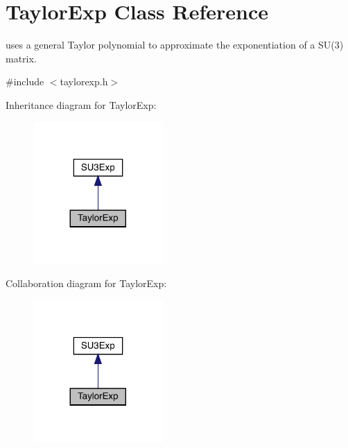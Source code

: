 \hypertarget{class_taylor_exp}{}\section{Taylor\+Exp Class Reference}
\label{class_taylor_exp}


uses a general Taylor polynomial to approximate the exponentiation of a S\+U(3) matrix.  




{\ttfamily \#include $<$taylorexp.\+h$>$}



Inheritance diagram for Taylor\+Exp\+:\nopagebreak
\begin{figure}[H]
\begin{center}
\leavevmode
\includegraphics[width=140pt]{class_taylor_exp__inherit__graph}
\end{center}
\end{figure}


Collaboration diagram for Taylor\+Exp\+:\nopagebreak
\begin{figure}[H]
\begin{center}
\leavevmode
\includegraphics[width=140pt]{class_taylor_exp__coll__graph}
\end{center}
\end{figure}
